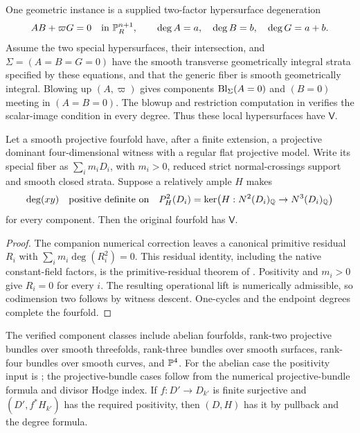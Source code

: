 One geometric instance is a supplied two-factor hypersurface
degeneration
\begin{equation}\label{eq:two-factor-model}
 AB+\varpi G=0\quad\text{in }\mathbb P^{n+1}_R,
 \qquad\deg A=a,\quad\deg B=b,\quad\deg G=a+b.
\end{equation}
Assume the two special hypersurfaces, their intersection, and
$\Sigma=(A=B=G=0)$ have the smooth transverse geometrically
integral strata specified by these equations, and that the generic
fiber is smooth geometrically integral. Blowing up $(A,\varpi)$
gives components $\operatorname{Bl}_\Sigma(A=0)$ and $(B=0)$ meeting in
$(A=B=0)$. The blowup and restriction computation in
\cite{InternalModelCriteria} verifies the scalar-image condition in
every degree. Thus these local hypersurfaces have $\mathsf V$.

\begin{proposition}\label{prop:positive-model}
Let a smooth projective fourfold have, after a finite extension, a
projective dominant four-dimensional witness with a regular flat
projective model. Write its special fiber as $\sum_i m_iD_i$, with
$m_i>0$, reduced strict normal-crossings support and smooth closed
strata. Suppose a relatively ample $H$ makes
\[
 \deg(xy)\quad\text{positive definite on}\quad
 P_H^2(D_i)=\ker\bigl(H:N^2(D_i)_\mathbb Q\to N^3(D_i)_\mathbb Q\bigr)
\]
for every component. Then the original fourfold has $\mathsf V$.
\end{proposition}

\begin{proof}
The companion numerical correction leaves a canonical primitive
residual $R_i$ with
$\sum_i m_i\deg(R_i^2)=0$. This residual identity, including the
native constant-field factors, is the primitive-residual theorem of
\cite{InternalModelCriteria}. Positivity and $m_i>0$ give $R_i=0$
for every $i$. The resulting operational lift is numerically
admissible, so codimension two follows by witness descent.
One-cycles and the endpoint degrees complete the fourfold.
\end{proof}

The verified component classes include abelian fourfolds, rank-two
projective bundles over smooth threefolds, rank-three bundles over
smooth surfaces, rank-four bundles over smooth curves, and $\mathbb P^4$.
For the abelian case the positivity input is \cite{Ancona}; the
projective-bundle cases follow from the numerical projective-bundle
formula and divisor Hodge index. If $f:D'\to D_{k'}$ is finite
surjective and $(D',f^*H_{k'})$ has the required positivity, then
$(D,H)$ has it by pullback and the degree formula.

